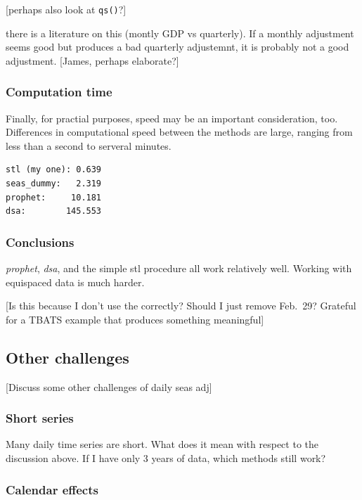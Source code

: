 {[}perhaps also look at \texttt{qs()}?{]}

there is a literature on this (montly GDP vs quarterly). If a monthly
adjustment seems good but produces a bad quarterly adjustemnt, it is
probably not a good adjustment. {[}James, perhaps elaborate?{]}

\hypertarget{computation-time}{%
\subsubsection{Computation time}\label{computation-time}}

Finally, for practial purposes, speed may be an important consideration,
too. Differences in computational speed between the methods are large,
ranging from less than a second to serveral minutes.

\begin{verbatim}
stl (my one): 0.639
seas_dummy:   2.319
prophet:     10.181
dsa:        145.553
\end{verbatim}

\hypertarget{conclusions}{%
\subsubsection{Conclusions}\label{conclusions}}

\emph{prophet}, \emph{dsa}, and the simple stl procedure all work
relatively well. Working with equispaced data is much harder.

{[}Is this because I don't use the correctly? Should I just remove
Feb.~29? Grateful for a TBATS example that produces something
meaningful{]}

\hypertarget{other-challenges}{%
\subsection{Other challenges}\label{other-challenges}}

{[}Discuss some other challenges of daily seas adj{]}

\hypertarget{short-series}{%
\subsubsection{Short series}\label{short-series}}

Many daily time series are short. What does it mean with respect to the
discussion above. If I have only 3 years of data, which methods still
work?

\hypertarget{calendar-effects}{%
\subsubsection{Calendar effects}\label{calendar-effects}}

